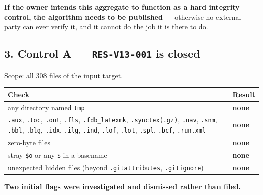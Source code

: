 \documentclass[
  9pt,
  a4paper,
]{article}
\newcounter{none} %
\begin{document}
\textbf{If the owner intends this aggregate to function as a hard
integrity control, the algorithm needs to be published} --- otherwise no
external party can ever verify it, and it cannot do the job it is there
to do.

\subsection{\texorpdfstring{3. Control A --- \texttt{RES-V13-001} is
closed}{3. Control A --- RES-V13-001 is closed}}\label{3-control-a--res-v13-001-is-closed}

Scope: all 308 files of the input target.

{\def\LTcaptype{none} %
\begin{longtable}[]{@{}ll@{}}
\toprule\noalign{}
Check & Result \\
\midrule\noalign{}
\endhead
\bottomrule\noalign{}
\endlastfoot
any directory named \texttt{tmp} & \textbf{none} \\
\texttt{.aux}, \texttt{.toc}, \texttt{.out}, \texttt{.fls},
\texttt{.fdb\_latexmk}, \texttt{.synctex(.gz)}, \texttt{.nav},
\texttt{.snm}, \texttt{.bbl}, \texttt{.blg}, \texttt{.idx},
\texttt{.ilg}, \texttt{.ind}, \texttt{.lof}, \texttt{.lot},
\texttt{.spl}, \texttt{.bcf}, \texttt{.run.xml} & \textbf{none} \\
zero-byte files & \textbf{none} \\
stray \texttt{\$o} or any \texttt{\$} in a basename & \textbf{none} \\
unexpected hidden files (beyond \texttt{.gitattributes},
\texttt{.gitignore}) & \textbf{none} \\
\end{longtable}
}

\textbf{Two initial flags were investigated and dismissed rather than
filed.}
\end{document}
